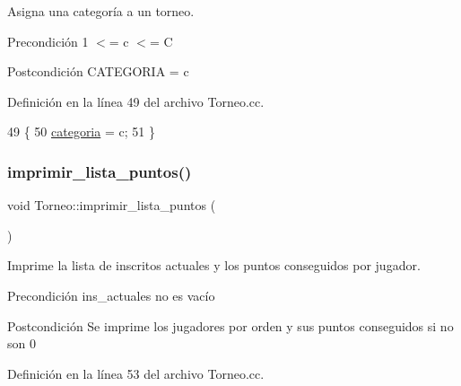 Asigna una categoría a un torneo. 

\begin{DoxyPrecond}{Precondición}
1 $<$= c $<$= C 
\end{DoxyPrecond}
\begin{DoxyPostcond}{Postcondición}
C\+A\+T\+E\+G\+O\+R\+IA = c 
\end{DoxyPostcond}


Definición en la línea 49 del archivo Torneo.\+cc.


\begin{DoxyCode}
49                                   \{
50   \hyperlink{class_torneo_ad9bec7ef311a416138abb99f3a487b3e}{categoria} = c;
51 \}
\end{DoxyCode}
\mbox{\label{class_torneo_ae5ed31026d55786a078666e4a7d4d62e}} 
\subsubsection{\texorpdfstring{imprimir\+\_\+lista\+\_\+puntos()}{imprimir\_lista\_puntos()}}
{\footnotesize\ttfamily void Torneo\+::imprimir\+\_\+lista\+\_\+puntos (\begin{DoxyParamCaption}{ }\end{DoxyParamCaption})}



Imprime la lista de inscritos actuales y los puntos conseguidos por jugador. 

\begin{DoxyPrecond}{Precondición}
ins\+\_\+actuales no es vacío 
\end{DoxyPrecond}
\begin{DoxyPostcond}{Postcondición}
Se imprime los jugadores por orden y sus puntos conseguidos si no son 0 
\end{DoxyPostcond}


Definición en la línea 53 del archivo Torneo.\+cc.



